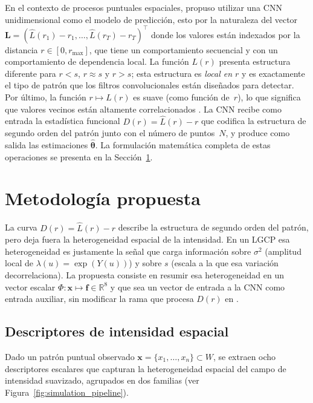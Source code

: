 \documentclass[a4paper,fleqn]{cas-sc}
\numberwithin{equation}{section}
\begin{document}
En el contexto de procesos puntuales espaciales, \citet{VIHRS2022} propuso
utilizar una CNN unidimensional como el modelo de predicci\'on, esto por la
naturaleza del vector
$\mathbf{L}=(\hat{L}(r_1)-r_1,\ldots,\hat{L}(r_T)-r_T)^\top$ donde los valores
est\'an indexados por la distancia $r\in[0,r_{\max}]$, que tiene un
comportamiento secuencial y con un comportamiento de dependencia local. La
funci\'on $L(r)$ presenta estructura diferente para $r < s$, $r \approx s$ y
$r > s$; esta estructura es \emph{local en $r$} y es exactamente el tipo de
patr\'on que los filtros convolucionales est\'an dise\~nados para detectar.
Por \'ultimo, la funci\'on $r\mapsto\hat{L}(r)$ es suave (como funci\'on
de~$r$), lo que significa que valores vecinos est\'an altamente correlacionados
\citep{Kiranyaz2021}. La CNN recibe como entrada la estad\'istica funcional
$D(r)=\hat{L}(r)-r$ que codifica la estructura de segundo orden del patr\'on
junto con el n\'umero de puntos~$N$, y produce como salida las estimaciones
$\hat{\boldsymbol{\theta}}$. La formulaci\'on matem\'atica completa de estas
operaciones se presenta en la Secci\'on~\ref{sec:metodo}.

\section{Metodolog\'ia propuesta}
\label{sec:metodo}

La curva $D(r)=\hat{L}(r)-r$ describe la estructura de segundo orden del
patr\'on, pero deja fuera la heterogeneidad espacial de la intensidad. En un
LGCP esa heterogeneidad es justamente la se\~nal que carga informaci\'on
sobre $\sigma^2$ (amplitud local de $\lambda(u)=\exp(Y(u))$) y sobre $s$
(escala a la que esa variaci\'on decorrelaciona). La propuesta consiste en
resumir esa heterogeneidad en un vector escalar
$\Phi\colon\mathbf{x}\mapsto\mathbf{f}\in\mathbb{R}^{8}$ y que sea un vector de entrada a
la CNN como entrada auxiliar, sin modificar la rama que procesa $D(r)$ en
\citet{VIHRS2022}.

\subsection{Descriptores de intensidad espacial}
\label{sec:features}

Dado un patr\'on puntual observado $\mathbf{x}=\{x_1,\ldots,x_n\}\subset W$,
se extraen ocho descriptores escalares que capturan la heterogeneidad
espacial del campo de intensidad suavizado, agrupados en dos familias
(ver Figura~\ref{fig:simulation_pipeline}).
\end{document}
